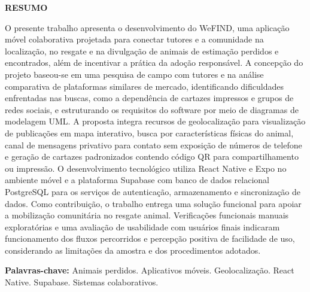 \thispagestyle{empty}

\begin{center}
    \textbf{\large RESUMO}
\end{center}

\vspace{14pt}

\begin{singlespace}
\noindent\justifying
O presente trabalho apresenta o desenvolvimento do WeFIND, uma aplicação móvel colaborativa projetada para conectar tutores e a comunidade na localização, no resgate e na divulgação de animais de estimação perdidos e encontrados, além de incentivar a prática da adoção responsável. A concepção do projeto baseou-se em uma pesquisa de campo com tutores e na análise comparativa de plataformas similares de mercado, identificando dificuldades enfrentadas nas buscas, como a dependência de cartazes impressos e grupos de redes sociais, e estruturando os requisitos do software por meio de diagramas de modelagem UML. A proposta integra recursos de geolocalização para visualização de publicações em mapa interativo, busca por características físicas do animal, canal de mensagens privativo para contato sem exposição de números de telefone e geração de cartazes padronizados contendo código QR para compartilhamento ou impressão. O desenvolvimento tecnológico utiliza React Native e Expo no ambiente móvel e a plataforma Supabase com banco de dados relacional PostgreSQL para os serviços de autenticação, armazenamento e sincronização de dados. Como contribuição, o trabalho entrega uma solução funcional para apoiar a mobilização comunitária no resgate animal. Verificações funcionais manuais exploratórias e uma avaliação de usabilidade com usuários finais indicaram funcionamento dos fluxos percorridos e percepção positiva de facilidade de uso, considerando as limitações da amostra e dos procedimentos adotados.

\vspace{18pt}

\noindent
\textbf{Palavras-chave:} Animais perdidos. Aplicativos móveis. Geolocalização. React Native. Supabase. Sistemas colaborativos.
\end{singlespace}

\clearpage
